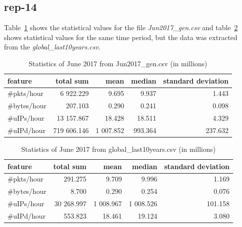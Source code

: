 \subsection*{rep-14}
Table~\ref{tab:stat_jun2017_gen} shows the statistical values for the file \textit{Jun2017\_gen.csv} and table~\ref{tab:stat_jun2017_global} shows statistical values for the same time period, but the data was extracted from the \textit{global\_last10years.csv}. 

\begin{table}[H]
\center
\begin{tabular}{lrrrr}
\toprule
feature & total sum & mean & median & standard deviation \\
\midrule
\#pkts/hour & 6 922.229  &   9.695  &    9.937  &   1.443 \\
\#bytes/hour & 207.103  &   0.290   &   0.241  &   0.098 \\
\#uIPs/hour  & 13 157.867  &  18.428  &   18.511 &    4.329 \\
\#uIPd/hour  & 719 606.146 &  1 007.852 &   993.364 &  237.632 \\
\bottomrule
\end{tabular}
\caption{Statistics of June 2017 from Jun2017\_gen.csv (in millions)}
\label{tab:stat_jun2017_gen}
\end{table}

\begin{table}[H]
\center
\begin{tabular}{lrrrr}
\toprule
feature & total sum & mean & median & standard deviation \\
\midrule
\#pkts/hour  &    291.275  &      9.709  &      9.996   &    1.169 \\
\#bytes/hour &      8.700  &      0.290  &      0.254   &    0.076 \\
\#uIPs/hour  & 30 268.997  &  1 008.967  &  1 008.526   &  101.158\\
\#uIPd/hour  &    553.823  &     18.461  &     19.124   &    3.080 \\
\bottomrule
\end{tabular}
\caption{Statistics of June 2017 from global\_last10years.csv (in millions)}
\label{tab:stat_jun2017_global}
\end{table}

